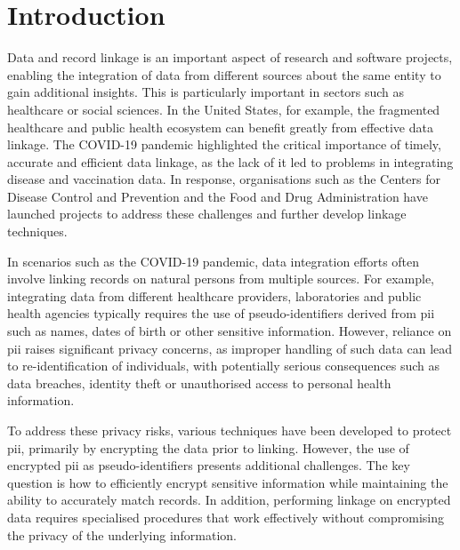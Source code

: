 
\chapter{Introduction}  \label{sec:introduction}
Data and record linkage is an important aspect of research and software projects, enabling the integration of data from different sources about the same entity to gain additional insights.
This is particularly important in sectors such as healthcare or social sciences.
In the United States, for example, the fragmented healthcare and public health ecosystem can benefit greatly from effective data linkage.
The COVID-19 pandemic highlighted the critical importance of timely, accurate and efficient data linkage, as the lack of it led to problems in integrating disease and vaccination data.
In response, organisations such as the Centers for Disease Control and Prevention and the Food and Drug Administration have launched projects to address these challenges and further develop linkage techniques. \cite{pathak2024privacy}

In scenarios such as the COVID-19 pandemic, data integration efforts often involve linking records on natural persons from multiple sources.
For example, integrating data from different healthcare providers, laboratories and public health agencies typically requires the use of pseudo-identifiers derived from \ac{pii} such as names, dates of birth or other sensitive information. 
However, reliance on \ac{pii} raises significant privacy concerns, as improper handling of such data can lead to re-identification of individuals, with potentially serious consequences such as data breaches, identity theft or unauthorised access to personal health information.

To address these privacy risks, various techniques have been developed to protect \ac{pii}, primarily by encrypting the data prior to linking. 
However, the use of encrypted \ac{pii} as pseudo-identifiers presents additional challenges.
The key question is how to efficiently encrypt sensitive information while maintaining the ability to accurately match records. 
In addition, performing linkage on encrypted data requires specialised procedures that work effectively without compromising the privacy of the underlying information.

